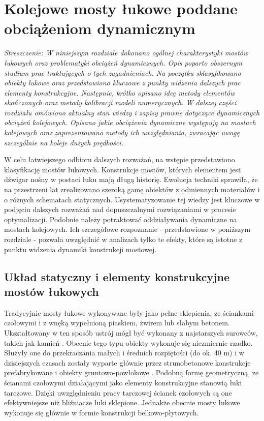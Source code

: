 \chapter{Kolejowe mosty łukowe poddane obciążeniom dynamicznym}
\textit{Streszczenie: W niniejszym rozdziale dokonano ogólnej charakterystyki mostów łukowych oraz problematyki obciążeń dynamicznych. Opis poparto obszernym studium prac traktujących o tych zagadnieniach. Na początku sklasyfikowano obiekty łukowe oraz przedstawiono kluczowe z punkty widzenia dalszych prac elementy konstrukcyjne. Następnie, krótko opisano ideę metody elementów skończonych oraz metody kalibracji modeli numerycznych. W dalszej części rozdziału omówiono aktualny stan wiedzy i zapisy prawne dotyczące dynamicznych obciążeń kolejowych. Opisano jakie obciążenia dynamiczne występują na mostach kolejowych oraz zaprezentowano metody ich uwzględniania, zwracając uwagę szczególnie na koleje dużych prędkości.}

\vspace{1cm}

W celu łatwiejszego odbioru dalszych rozważań, na wstępie przedstawiono klasyfikację mostów łukowych. Konstrukcje mostów, których elementem jest dźwigar nośny w postaci łuku mają długą historię. Ewolucja techniki sprawiła, że na przestrzeni lat zrealizowano szeroką gamę obiektów z odmiennych materiałów i o różnych schematach statycznych. Usystematyzowanie tej wiedzy jest kluczowe w podjęciu dalszych rozważań nad dopuszczalnymi rozwiązaniami w procesie optymalizacji. Podobnie należy potraktować oddziaływania dynamiczne na mostach kolejowych. Ich szczegółowe rozpoznanie - przedstawione w poniższym rozdziale - pozwala uwzględnić w analizach tylko te efekty, które są istotne z punktu widzenia dynamiki konstrukcji mostowej.

\section{Układ statyczny i elementy konstrukcyjne mostów łukowych}

Tradycyjnie mosty łukowe wykonywane były jako pełne sklepienia, ze ściankami czołowymi i z wnęką wypełnioną piaskiem, żwirem lub słabym betonem. Ukształtowany w ten sposób ustrój mógł być wykonany z najstarszych surowców, takich jak kamień \parencite{Szczygie1978}. Obecnie tego typu obiekty wykonuje się niezmiernie rzadko. Służyły one do przekraczania małych i średnich rozpiętości (do ok. 40 m) i w dzisiejszych czasach zostały wyparte głównie przez strunobetonowe konstrukcje prefabrykowane \parencite{Ciesla2013} i obiekty gruntowo-powłokowe \parencite{Janusz2009,Tomala2019}. Podobną formę geometryczną, ze ścianami czołowymi działającymi jako elementy konstrukcyjne stanowią łuki tarczowe. Dzięki uwzględnieniu pracy tarczowej ścianek czołowych są one efektywniejsze niż bliźniacze łuki sklepione. Jednakże obecnie mosty łukowe wykonuje się głównie w formie konstrukcji belkowo-płytowych. 


